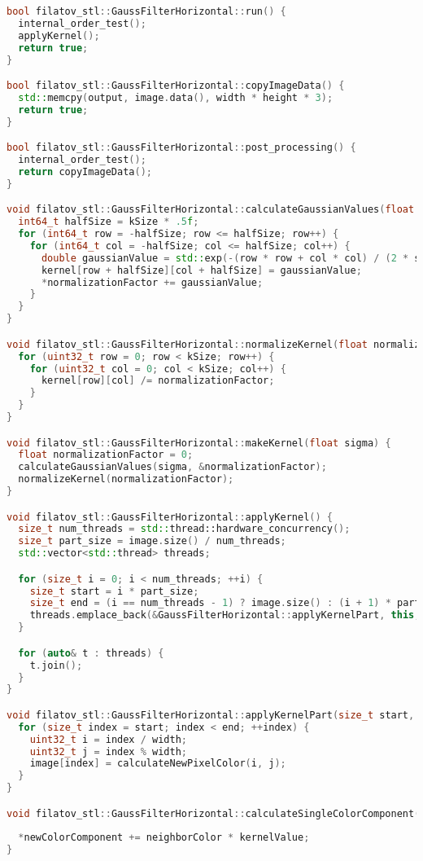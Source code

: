 \documentclass{report}
\begin{document}
\begin{lstlisting}[language=C++,caption=STL версия]
bool filatov_stl::GaussFilterHorizontal::run() {
  internal_order_test();
  applyKernel();
  return true;
}

bool filatov_stl::GaussFilterHorizontal::copyImageData() {
  std::memcpy(output, image.data(), width * height * 3);
  return true;
}

bool filatov_stl::GaussFilterHorizontal::post_processing() {
  internal_order_test();
  return copyImageData();
}

void filatov_stl::GaussFilterHorizontal::calculateGaussianValues(float sigma, float* normalizationFactor) {
  int64_t halfSize = kSize * .5f;
  for (int64_t row = -halfSize; row <= halfSize; row++) {
    for (int64_t col = -halfSize; col <= halfSize; col++) {
      double gaussianValue = std::exp(-(row * row + col * col) / (2 * sigma * sigma));
      kernel[row + halfSize][col + halfSize] = gaussianValue;
      *normalizationFactor += gaussianValue;
    }
  }
}

void filatov_stl::GaussFilterHorizontal::normalizeKernel(float normalizationFactor) {
  for (uint32_t row = 0; row < kSize; row++) {
    for (uint32_t col = 0; col < kSize; col++) {
      kernel[row][col] /= normalizationFactor;
    }
  }
}

void filatov_stl::GaussFilterHorizontal::makeKernel(float sigma) {
  float normalizationFactor = 0;
  calculateGaussianValues(sigma, &normalizationFactor);
  normalizeKernel(normalizationFactor);
}

void filatov_stl::GaussFilterHorizontal::applyKernel() {
  size_t num_threads = std::thread::hardware_concurrency();
  size_t part_size = image.size() / num_threads;
  std::vector<std::thread> threads;

  for (size_t i = 0; i < num_threads; ++i) {
    size_t start = i * part_size;
    size_t end = (i == num_threads - 1) ? image.size() : (i + 1) * part_size;
    threads.emplace_back(&GaussFilterHorizontal::applyKernelPart, this, start, end);
  }

  for (auto& t : threads) {
    t.join();
  }
}

void filatov_stl::GaussFilterHorizontal::applyKernelPart(size_t start, size_t end) {
  for (size_t index = start; index < end; ++index) {
    uint32_t i = index / width;
    uint32_t j = index % width;
    image[index] = calculateNewPixelColor(i, j);
  }
}

void filatov_stl::GaussFilterHorizontal::calculateSingleColorComponent(uint8_t neighborColor, float kernelValue,
                                                                       float* newColorComponent) {
  *newColorComponent += neighborColor * kernelValue;
}


\end{lstlisting}
\end{document}
